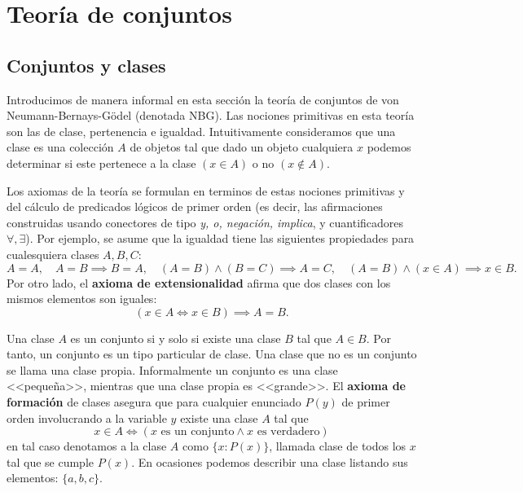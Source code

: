 \appendix
\chapter{Teoría de conjuntos}

\section{Conjuntos y clases}

Introducimos de manera informal en esta sección la teoría de conjuntos de von Neumann-Bernays-Gödel (denotada NBG). Las nociones primitivas en esta teoría son las de clase, pertenencia e igualdad. Intuitivamente consideramos que una clase es una colección $A$ de objetos tal que dado un objeto cualquiera $x$ podemos determinar si este pertenece a la clase $(x \in A)$ o no $(x \notin A)$.

Los axiomas de la teoría se formulan en terminos de estas nociones primitivas y del cálculo de predicados lógicos de primer orden (es decir, las afirmaciones construidas usando conectores de tipo \textit{y, o, negación, implica}, y cuantificadores $\forall, \exists$). Por ejemplo, se asume que la igualdad tiene las siguientes propiedades para cualesquiera clases $A,B,C$:
\[
A=A,\quad A=B \implies B=A,\quad (A=B) \land (B=C) \implies A=C,\quad (A=B) \land (x \in A) \implies x \in B.
\]
Por otro lado, el \textbf{axioma de extensionalidad} afirma que dos clases con los mismos elementos son iguales:
\[
(x \in A \iff x \in B) \implies A = B.
\]

Una clase $A$ es un conjunto si y solo si existe una clase $B$ tal que $A \in B$. Por tanto, un conjunto es un tipo particular de clase. Una clase que no es un conjunto se llama una clase propia. Informalmente un conjunto es una clase <<pequeña>>, mientras que una clase propia es <<grande>>. El \textbf{axioma de formación} de clases asegura que para cualquier enunciado $P(y)$ de primer orden involucrando a la variable $y$ existe una clase $A$ tal que
\[
x \in A \iff (x \text{ es un conjunto} \land x \text{ es verdadero})
\]
en tal caso denotamos a la clase $A$ como $\{x : P(x)\}$, llamada clase de todos los $x$ tal que se cumple $P(x)$. En ocasiones podemos describir una clase listando sus elementos: $\{a,b,c\}$.


